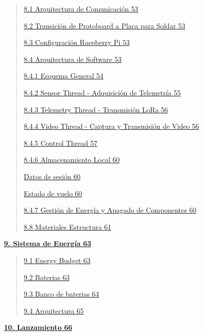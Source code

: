 \documentclass[12pt,a4paper]{article}
\begin{document}
\begin{quote}
\hyperref[arquitectura-de-comunicaciuxf3n]{8.1 Arquitectura de Comunicación 53}

\hyperref[transiciuxf3n-de-protoboard-a-placa-para-soldar]{8.2 Transición de Protoboard a Placa para Soldar 53}

\hyperref[configuraciuxf3n-raspberry-pi]{8.3 Configuración Raspberry Pi 53}

\hyperref[control-thread]{8.4 Arquitectura de Software 53}

\hyperref[esquema-general]{8.4.1 Esquema General 54}

\hyperref[control-thread]{8.4.2 Sensor Thread - Adquisición de Telemetría 55}

\hyperref[telemetry-thread---transmisiuxf3n-lora]{8.4.3 Telemetry Thread - Transmisión LoRa 56}

\hyperref[video-thread---captura-y-transmisiuxf3n-de-video]{8.4.4 Video Thread - Captura y Transmisión de Video 56}

\hyperref[control-thread]{8.4.5 Control Thread 57}

\hyperref[almacenamiento-local]{8.4.6 Almacenamiento Local 60}

\hyperref[datos-de-sesiuxf3n]{Datos de sesión 60}

\hyperref[estado-de-vuelo]{Estado de vuelo 60}

\hyperref[gestiuxf3n-de-energuxeda-y-apagado-de-componentes]{8.4.7 Gestión de Energía y Apagado de Componentes 60}

\hyperref[materiales-estructura]{8.8 Materiales Estructura 61}
\end{quote}

\hyperref[sistema-de-energuxeda]{\textbf{9. Sistema de Energía 63}}

\begin{quote}
\hyperref[energy-budget]{9.1 Energy Budget 63}

\hyperref[baterias-1]{9.2 Baterias 63}

\hyperref[banco-de-baterias]{9.3 Banco de baterias 64}

\hyperref[arquitectura]{9.4 Arquitectura 65}
\end{quote}

\hyperref[lanzamiento]{\textbf{10. Lanzamiento 66}}
\end{document}

